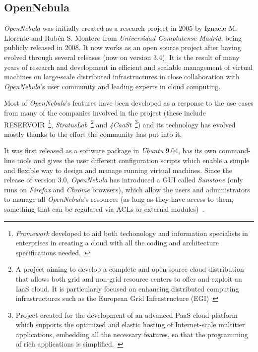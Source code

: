 \subsection{OpenNebula}\label{subsec:opennebula}


\textit{OpenNebula} was initially created as a research project in 2005 by Ignacio M. Llorente and Rubén S. Montero from \textit{Universidad Complutense Madrid}, being publicly released in 2008. It now works as an open source project after having evolved through several releases (now on version 3.4). It is the result of many years of research and development in efficient and scalable management of virtual machines on large-scale distributed infrastructures in close collaboration with \textit{OpenNebula}'s user community and leading experts in cloud computing. 

Most of \textit{OpenNebula}'s features have been developed as a response to the use cases from many of the companies involved in the project (these include RESERVOIR~\footnote{\textit{Framework} developed to aid both techonology and information specialists in enterprises in creating a cloud with all the coding and architecture specifications needed.~\cite{reservoir}}, \textit{StratusLab}~\footnote{A project aiming to develop a complete and open-source cloud distribution that allows both grid and non-grid resource centers to offer and exploit an IaaS cloud. It is particularly focused on enhancing distributed computing infrastructures such as the European Grid Infrastructure (EGI)~\cite{stratuslab}} and \textit{4CaaSt}~\footnote{Project created for the development of an advanced PaaS cloud platform which supports the optimized and elastic hosting of Internet-scale multitier applications, embedding all the necessary features, so that the programming of rich applications is simplified.~\cite{4caast}}) and its technology has evolved mostly thanks to the effort the community has put into it.~\cite{opennebula}

It was first released as a software package in \textit{Ubuntu} 9.04, has its own command-line tools and gives the user different configuration scripts which enable a simple and flexible way to design and manage running virtual machines. Since the release of version 3.0, \textit{OpenNebula} has introduced a GUI called \textit{Sunstone} (only runs on \textit{Firefox} and \textit{Chrome} browsers), which allow the users and administrators to manage all \textit{OpenNebula}'s resources (as long as they have access to them, something that can be regulated via ACLs or external modules)~\cite{jorge-ruao}.

